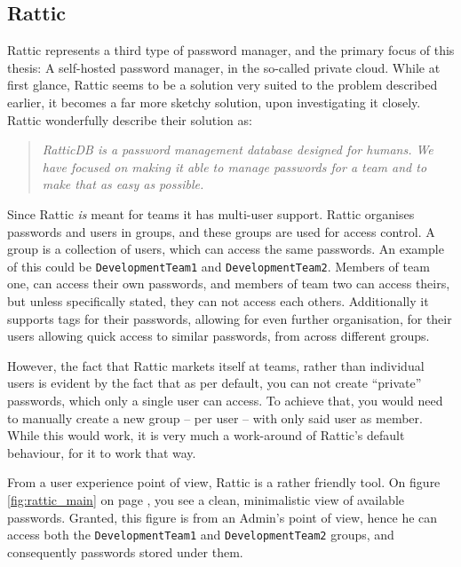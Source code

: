 		\subsection*{Rattic}
			Rattic\cite{rattic_frontpage} represents a third type of password manager, and the primary focus of this thesis: A self-hosted password manager, in the so-called private cloud. While at first glance, Rattic seems to be a solution very suited to the problem described earlier, it becomes a far more sketchy solution, upon investigating it closely. Rattic wonderfully describe their solution as:

			\begin{quote}
				\emph{RatticDB is a password management database designed for humans. We have focused on making it able to manage passwords for a team and to make that as easy as possible.}\\\cite{rattic_frontpage}
			\end{quote}

			Since Rattic \emph{is} meant for teams it has multi-user support. Rattic organises passwords and users in groups, and these groups are used for access control. A group is a collection of users, which can access the same passwords. An example of this could be \verb=DevelopmentTeam1= and \verb=DevelopmentTeam2=. Members of team one, can access their own passwords, and members of team two can access theirs, but unless specifically stated, they can not access each others. Additionally it supports tags for their passwords, allowing for even further organisation, for their users allowing quick access to similar passwords, from across different groups.

			However, the fact that Rattic markets itself at teams, rather than individual users is evident by the fact that as per default, you can not create ``private'' passwords, which only a single user can access. To achieve that, you would need to manually create a new group -- per user -- with only said user as member. While this would work, it is very much a work-around of Rattic's default behaviour, for it to work that way.

			From a user experience point of view, Rattic is a rather friendly tool. On figure \ref{fig:rattic_main} on page \pageref{fig:rattic_main}, you see a clean, minimalistic view of available passwords. Granted, this figure is from an Admin's point of view, hence he can access both the \verb=DevelopmentTeam1= and \verb=DevelopmentTeam2= groups, and consequently passwords stored under them.

